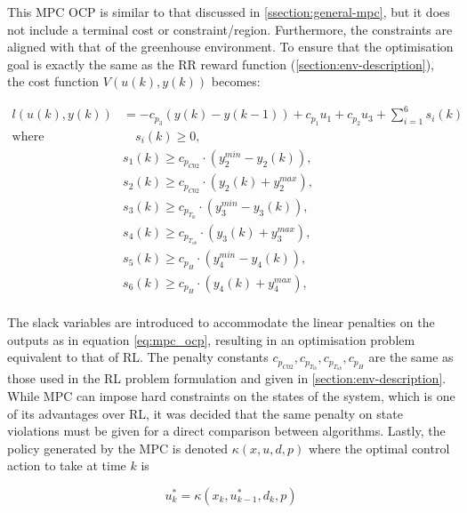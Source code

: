 This MPC OCP is similar to that discussed in \autoref{ssection:general-mpc}, but it does not include a terminal cost or constraint/region. Furthermore, the constraints are aligned with that of the greenhouse environment. To ensure that the optimisation goal is exactly the same as the RR reward function (\autoref{section:env-description}), the cost function $V(u(k),y(k))$ becomes:

\begin{equation} \label{eq:mpc_stage_cost}
	\begin{aligned}
		l(u(k),y(k)) & = - c_{p_3} (y(k) - y(k-1)) + c_{p_1} u_{1} + c_{p_2} u_{3} + \sum_{i = 1}^6 s_i(k) \\
		\text{where} & \quad s_i(k) \geq 0, \\
		& s_1(k) \geq c_{p_{C02}} \cdot (y_2^{min} - y_2(k)), \\ 
		& s_2(k) \geq c_{p_{C02}} \cdot (y_2(k) + y_2^{max}), \\ 
		& s_3(k) \geq c_{p_{T_{lb}}} \cdot (y_3^{min} - y_3(k)), \\ 
		& s_4(k) \geq c_{p_{T_{ub}}} \cdot (y_3(k) + y_3^{max}), \\ 
		& s_5(k) \geq c_{p_{H}} \cdot (y_4^{min} - y_4(k)), \\ 
		& s_6(k) \geq c_{p_{H}} \cdot (y_4(k) + y_4^{max}), \\
	\end{aligned}	
\end{equation}

The slack variables are introduced to accommodate the linear penalties on the outputs as in equation \autoref{eq:mpc_ocp}, resulting in an optimisation problem equivalent to that of RL. The penalty constants $c_{p_{C02}},c_{p_{T_{lb}}},c_{p_{T_{ub}}},c_{p_{H}}$ are the same as those used in the RL problem formulation and given in \autoref{section:env-description}. While MPC can impose hard constraints on the states of the system, which is one of its advantages over RL, it was decided that the same penalty on state violations must be given for a direct comparison between algorithms. Lastly, the policy generated by the MPC is denoted $\kappa(x,u,d,p)$ where the optimal control action to take at time $k$ is

\begin{equation}\label{eq:mpc_policy_notation}
	u_k^* = \kappa(x_k,u_{k-1}^*, d_k, p)
\end{equation}



